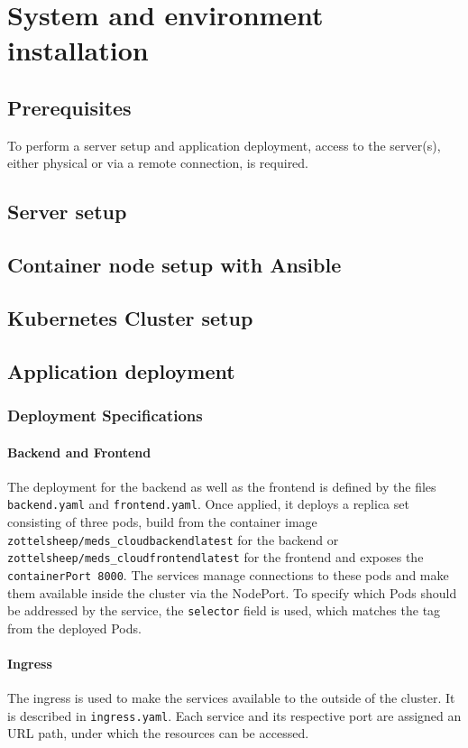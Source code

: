 \chapter{System and environment installation}
\section{Prerequisites}
    To perform a server setup and application deployment, access to the server(s), either physical or via a remote connection, is required.
    
\section{Server setup}
\section{Container node setup with Ansible}
\section{Kubernetes Cluster setup}
\section{Application deployment}
    \subsection{Deployment Specifications}
        \subsubsection{Backend and Frontend}
            The deployment for the backend as well as the frontend is defined by the files \texttt{backend.yaml} and \texttt{frontend.yaml}.
            Once applied, it deploys a replica set consisting of three pods, build from the container image \texttt{zottelsheep/meds\_cloud\:backend\-latest} for the backend
            or \texttt{zottelsheep/meds\_cloud\:frontend\-latest} for the frontend and exposes the \texttt{containerPort 8000}.
            The services manage connections to these pods and make them available inside the cluster via the NodePort. 
            To specify which Pods should be addressed by the service, the \texttt{selector} field is used, which matches the tag from the deployed Pods.

        \subsubsection{Ingress}
            The ingress is used to make the services available to the outside of the cluster.
            It is described in \texttt{ingress.yaml}.
            Each service and its respective port are assigned an URL path, under which the resources can be accessed. 
        

